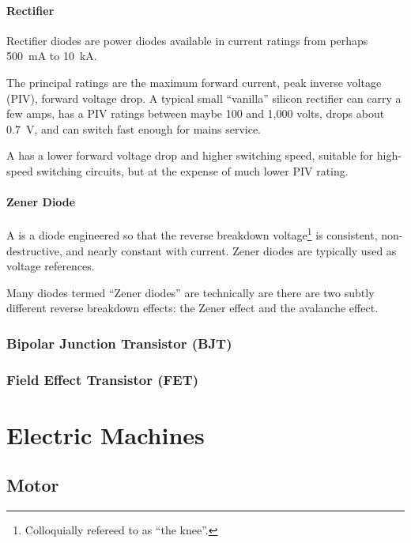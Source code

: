 \documentclass[11pt]{article}
\begin{document}
\paragraph{Rectifier}

Rectifier diodes are power diodes available in current ratings from
perhaps 500~\unit{mA} to 10~\unit{kA}.

The principal ratings are the maximum forward current, peak inverse
voltage (PIV), forward voltage drop. A typical small ``vanilla''
silicon rectifier can carry a few amps, has a PIV ratings between
maybe 100 and 1,000 volts, drops about 0.7~\unit{V}, and can switch
fast enough for mains service.

A  has a lower forward voltage drop and higher
switching speed, suitable for high-speed switching circuits, but at
the expense of much lower PIV rating.

\paragraph{Zener Diode}

A  is a diode engineered so that the reverse
breakdown voltage\footnote{Colloquially refereed to as ``the knee''.}
is consistent, non-destructive, and nearly constant with
current. Zener diodes are typically used as voltage references.

Many diodes termed ``Zener diodes'' are technically  are there are two subtly different reverse breakdown
effects: the Zener effect and the avalanche effect.


\subsubsection{Bipolar Junction Transistor (BJT)}



\subsubsection{Field Effect Transistor (FET)}


\section{Electric Machines}

\subsection{Motor}
\end{document}
